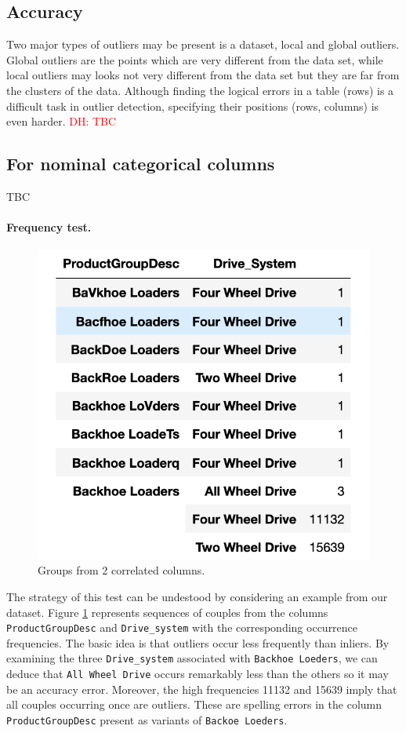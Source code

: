 \documentclass{article}
\newcommand\dhawat[1]{\textcolor{red}{DH: #1}}
\begin{document}
\subsection{Accuracy} %
\label{sub:Accuracy }
Two major types of outliers may be present is a dataset, local and global outliers.
Global outliers are the points which are very different from the data set, while local outliers may looks not very different from the data set but they are far from the clusters of the data.
Although finding the logical errors in a table (rows) is a difficult task in outlier detection, specifying their positions (rows, columns) is even harder.
\dhawat{TBC}
\subsection{For nominal categorical columns} %
TBC
\paragraph{Frequency test.}
\label{par:frequncy_test}
\begin{figure}[h]
    \centering
    \includegraphics[width=0.5\linewidth]{picture/logic_err.png}
    \caption{Groups from 2 correlated columns.}
    \label{fig:logic_err}
\end{figure}
The strategy of this test can be undestood by considering an example from our dataset.
Figure \ref{fig:logic_err} represents sequences of couples from the columns \texttt{ProductGroupDesc} and \texttt{Drive\_system} with the corresponding occurrence frequencies.
The basic idea is that outliers occur less frequently than inliers.
By examining the three \texttt{Drive\_system} associated with \texttt{Backhoe Loeders}, we can deduce that \texttt{All Wheel Drive} occurs remarkably less than the others so it may be an accuracy error.
Moreover, the high frequencies 11132 and 15639 imply that all couples occurring once are outliers.
These are spelling errors in the column \texttt{ProductGroupDesc} present as variants of \texttt{Backoe Loeders}.
\end{document}

